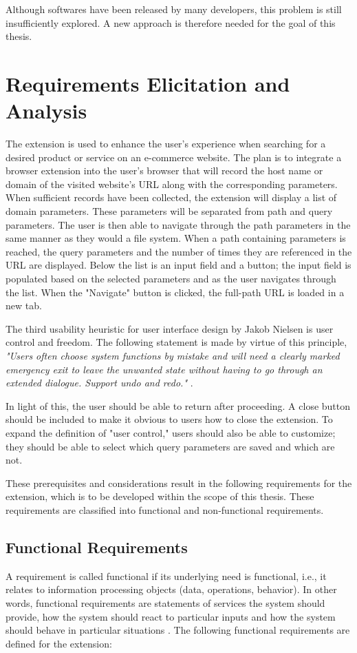 Although softwares have been released by many developers, this problem is still insufficiently explored. A new approach is therefore needed for the goal of this thesis.

\section{Requirements Elicitation and Analysis}
\label{requirements_analysis}
The extension is used to enhance the user's experience when searching for a desired product or service on an e-commerce website. The plan is to integrate a browser extension into the user's browser that will record the host name or domain of the visited website's URL along with the corresponding parameters. When sufficient records have been collected, the extension will display a list of domain parameters. These parameters will be separated from path and query parameters. The user is then able to navigate through the path parameters in the same manner as they would a file system. When a path containing parameters is reached, the query parameters and the number of times they are referenced in the URL are displayed. Below the list is an input field and a button; the input field is populated based on the selected parameters and as the user navigates through the list. When the "Navigate" button is clicked, the full-path URL is loaded in a new tab.

The third usability heuristic for user interface design by Jakob Nielsen is user control and freedom. The following statement is made by virtue of this principle, \emph{"Users often choose system functions by mistake and will need a clearly marked emergency exit to leave the unwanted state without having to go through an extended dialogue. Support undo and redo."} \autocite{nielsen1994usability}.

In light of this, the user should be able to return after proceeding. A close button should be included to make it obvious to users how to close the extension. To expand the definition of "user control," users should also be able to customize; they should be able to select which query parameters are saved and which are not.

These prerequisites and considerations result in the following requirements for the extension, which is to be developed within the scope of this thesis. These requirements are classified into functional and non-functional requirements.

\subsection{Functional Requirements}
\label{functional_requirements}
A requirement is called functional if its underlying need is functional, i.e., it relates to information processing objects (data, operations, behavior). In other words, functional requirements are statements of services the system should provide, how the system should react to particular inputs and how the system should behave in particular situations \autocite{sommerville2011software}. The following functional requirements are defined for the extension:

